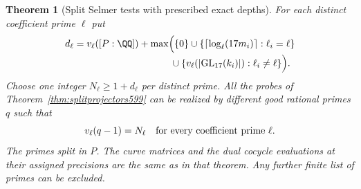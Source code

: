 \documentclass[a4paper,11pt]{article}
\newtheorem{theorem}[proposition]{Theorem}
\theoremstyle{definition}
\theoremstyle{remark}
\numberwithin{equation}{section}
\begin{document}
\begin{theorem}[Split Selmer tests with prescribed exact depths]
\leavevmode\label{thm:exactselmer614}
For each distinct coefficient prime \(\ell\) put
\begin{align*}
 d_\ell={}&v_\ell([P:\QQ])+
 \max\Bigl(\{0\}
   \cup\{\lceil\log_\ell(17m_i)\rceil:\ell_i=\ell\}\\[-2pt]
 &\hspace{87pt}{}\cup
      \{v_\ell(|\mathrm{GL}_{17}(k_i)|):\ell_i\ne\ell\}\Bigr).
\end{align*}
Choose one integer \(N_\ell\ge1+d_\ell\) per distinct prime.
All the probes of Theorem~\ref{thm:splitprojectors599} can be
realized by different good rational primes \(q\) such that
\[
              v_\ell(q-1)=N_\ell
                 \quad\hbox{for every coefficient prime }\ell .
\]
The primes split in \(P\). The curve matrices and the dual
cocycle evaluations at their assigned precisions are the same
as in that theorem. Any further finite list of primes can be
excluded.
\end{theorem}
\end{document}
